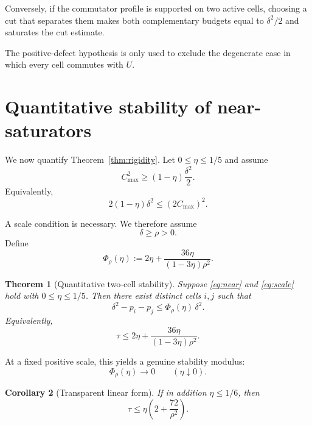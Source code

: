 \documentclass[11pt]{article}
\newtheorem{theorem}{Theorem}[section]
\newtheorem{corollary}[theorem]{Corollary}
\newcommand{\cmax}{C_{\max}}
\newcommand{\dd}{\delta}
\newcommand{\etaq}{\eta}
\newcommand{\tauq}{\tau}
\newcommand{\PhiRho}{\Phi_{\rho}}
\begin{document}
Conversely, if the commutator profile is supported on two active cells,
choosing a cut that separates them makes both complementary budgets equal to
$\dd^2/2$ and saturates the cut estimate.

The positive-defect hypothesis is only used to exclude the degenerate case
in which every cell commutes with $U$.

\section{Quantitative stability of near-saturators}

We now quantify Theorem~\ref{thm:rigidity}.  Let
$0\le\etaq\le1/5$ and assume
\begin{equation}\label{eq:near}
  \cmax^2
  \ge
  (1-\etaq)\frac{\dd^2}{2}.
\end{equation}
Equivalently,
\[
  2(1-\etaq)\dd^2\le (2\cmax)^2.
\]

A scale condition is necessary.  We therefore assume
\begin{equation}\label{eq:scale}
  \dd\ge\rho>0.
\end{equation}
Define
\begin{equation}\label{eq:modulus}
  \PhiRho(\etaq):=
  2\etaq+
  \frac{36\etaq}{(1-3\etaq)\rho^2}.
\end{equation}

\begin{theorem}[Quantitative two-cell stability]\label{thm:stability}
Suppose \eqref{eq:near} and \eqref{eq:scale} hold with
$0\le\etaq\le1/5$.  Then there exist distinct cells $i,j$ such that
\begin{equation}\label{eq:stability-conclusion}
  \boxed{
  \dd^2-p_i-p_j
  \le
  \PhiRho(\etaq)\,\dd^2.
  }
\end{equation}
Equivalently,
\[
  \tauq\le
  2\etaq+
  \frac{36\etaq}{(1-3\etaq)\rho^2}.
\]
\end{theorem}

At a fixed positive scale, this yields a genuine stability modulus:
\[
  \PhiRho(\etaq)\longrightarrow0
  \qquad(\etaq\downarrow0).
\]

\begin{corollary}[Transparent linear form]\label{cor:linear}
If in addition $\etaq\le1/6$, then
\begin{equation}\label{eq:linear}
  \boxed{
    \tauq\le
    \etaq\left(2+\frac{72}{\rho^2}\right).
  }
\end{equation}
\end{corollary}
\end{document}
